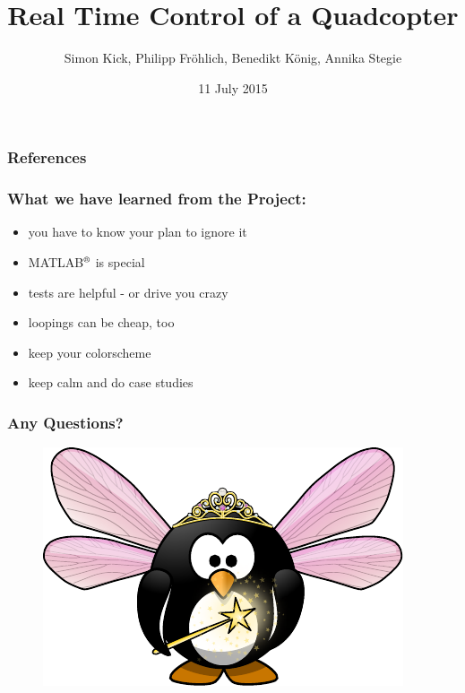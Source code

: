 \documentclass[12pt]{beamer} %
\title{Real Time Control of a Quadcopter}
\author{Simon Kick, Philipp Fr\"ohlich, Benedikt K\"onig, Annika Stegie}
\institute{Technische Universit\"at M\"unchen}
\date{11 July 2015}
\begin{document}
\begin{frame}
\maketitle
\thispagestyle{empty}
\end{frame}













\nocite{Boyd2009}
\nocite{Diehl2001}
\nocite{Diehl2002}
\nocite{Diehl2005}
\nocite{Diebel2006}
\nocite{Garcia2013}
\nocite{Richter-Gebert2009}
\nocite{Reyes-Valeria2013}
\nocite{Hartmann2014}
%
\begin{frame}[allowframebreaks] %
 \frametitle{References}
	
	
\end{frame}

\begin{frame}
	\frametitle{What we have learned from the Project:}
	\begin{doublespace}
	\begin{itemize}
		\item you have to know your plan to ignore it
		\item MATLAB\(^{\text{\textregistered}}\) is special
		\item tests are helpful - or drive you crazy
		\item loopings can be cheap, too
		\item keep your colorscheme
		\item keep calm and do case studies
	\end{itemize}
	\end{doublespace}
\end{frame}

\begin{frame}
\frametitle{Any Questions?}
	\begin{figure}%
	\includegraphics[width=0.9\columnwidth]{images/Easter_Egg/fairy-penguin}%
	\end{figure}
\end{frame}
\end{document}
